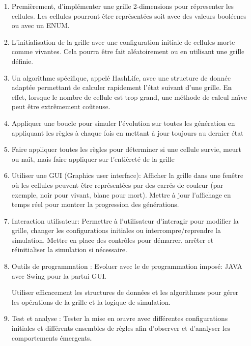 \begin{enumerate}
    \item Premièrement, d'implémenter une grille 2-dimensions pour répresenter les cellules.
    Les cellules pourront être représentées soit avec des valeurs booléenes ou avec un ENUM.

    \item L'initialisation de la grille avec une configuration initiale de cellules morte comme vivantes. Cela pourra être fait aléatoirement ou en utilisant une grille définie.
    
    \item Un algorithme spécifique, appelé HashLife, avec une structure de donnée adaptée permettant de calculer rapidement l'état suivant d'une grille. En effet, lorsque le nombre de cellule est trop grand, une méthode de calcul naïve peut être extrêmement coûteuse.

    \item Appliquer une boucle pour simuler l'évolution sur toutes les génération en appliquant les règles à chaque fois en mettant à jour toujours au dernier état

    \item Faire appliquer toutes les règles pour déterminer si une cellule survie, meurt ou naît, mais faire appliquer sur l'entièreté de la grille

    \item Utiliser une GUI (Graphics user interface): Afficher la grille dans une fenêtre où les cellules peuvent être représentées par des carrés de couleur (par exemple, noir pour vivant, blanc pour mort).
 Mettre à jour l'affichage en temps réel pour montrer la progression des générations.

 \item Interaction utilisateur: Permettre à l'utilisateur d'interagir pour modifier la grille, changer les configurations initiales ou interrompre/reprendre la simulation.
Mettre en place des contrôles pour démarrer, arrêter et réinitialiser la simulation si nécessaire.

    \item Outils de programmation : Evoluer avec le de programmation imposé: JAVA avec Swing pour la partui GUI.
    
    Utiliser efficacement les structures de données et les algorithmes pour gérer les opérations de la grille et la logique de simulation.
    
    \item Test et analyse :
Tester la mise en œuvre avec différentes configurations initiales et différents ensembles de règles afin d'observer et d'analyser les comportements émergents.


\end{enumerate}


